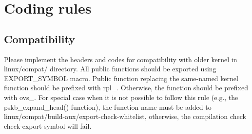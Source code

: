 \section*{Coding rules }

\subsection*{Compatibility }

Please implement the headers and codes for compatibility with older kernel in linux/compat/ directory. All public functions should be exported using E\+X\+P\+O\+R\+T\+\_\+\+S\+Y\+M\+B\+O\+L macro. Public function replacing the same-\/named kernel function should be prefixed with \textquotesingle{}rpl\+\_\+\textquotesingle{}. Otherwise, the function should be prefixed with \textquotesingle{}ovs\+\_\+\textquotesingle{}. For special case when it is not possible to follow this rule (e.\+g., the pskb\+\_\+expand\+\_\+head() function), the function name must be added to linux/compat/build-\/aux/export-\/check-\/whitelist, otherwise, the compilation check \textquotesingle{}check-\/export-\/symbol\textquotesingle{} will fail. 